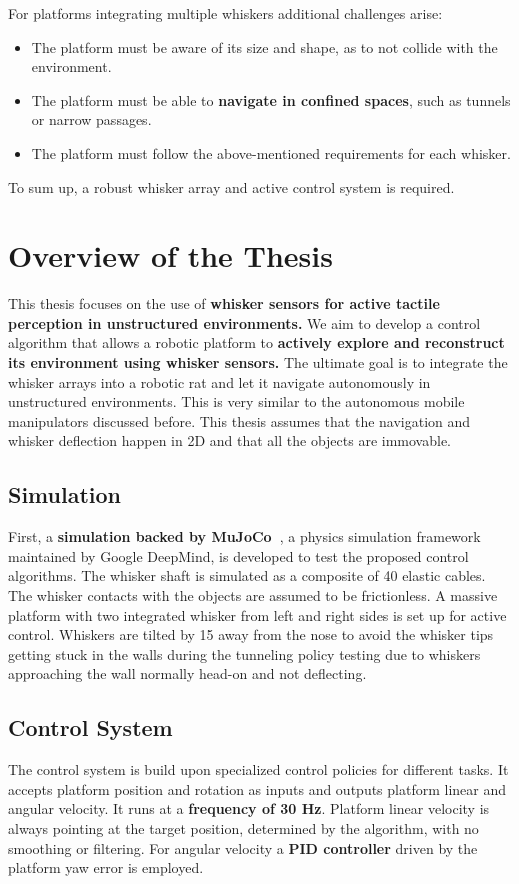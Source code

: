 For platforms integrating multiple whiskers additional challenges arise:
\begin{itemize}
    \item The platform must be aware of its size and shape, as to not collide with the environment.
    \item The platform must be able to \textbf{navigate in confined spaces}, such as tunnels or narrow passages.
    \item The platform must follow the above-mentioned requirements for each whisker.
\end{itemize}

To sum up, a robust whisker array and active control system is required.


\section{Overview of the Thesis}

This thesis focuses on the use of \textbf{whisker sensors for active tactile perception in unstructured environments.}
We aim to develop a control algorithm that allows a robotic platform to \textbf{actively explore and reconstruct its environment using whisker sensors.}
The ultimate goal is to integrate the whisker arrays into a robotic rat and let it navigate autonomously in unstructured environments.
This is very similar to the autonomous mobile manipulators discussed before.
This thesis assumes that the navigation and whisker deflection happen in 2D and that all the objects are immovable.

\subsection{Simulation}
First, a \textbf{simulation backed by MuJoCo~\cite{todorov2012mujoco}}, a physics simulation framework maintained by Google DeepMind, is developed to test the proposed control algorithms.
The whisker shaft is simulated as a composite of 40 elastic cables.
The whisker contacts with the objects are assumed to be frictionless.
A massive platform with two integrated whisker from left and right sides is set up for active control.
Whiskers are tilted by 15\degree{} away from the nose to avoid the whisker tips getting stuck in the walls during the tunneling policy testing due to whiskers approaching the wall normally head-on and not deflecting.

\subsection{Control System}
The control system is build upon specialized control policies for different tasks.
It accepts platform position and rotation as inputs and outputs platform linear and angular velocity.
It runs at a \textbf{frequency of 30 Hz}.
Platform linear velocity is always pointing at the target position, determined by the algorithm, with no smoothing or filtering.
For angular velocity a \textbf{PID controller} driven by the platform yaw error is employed.

